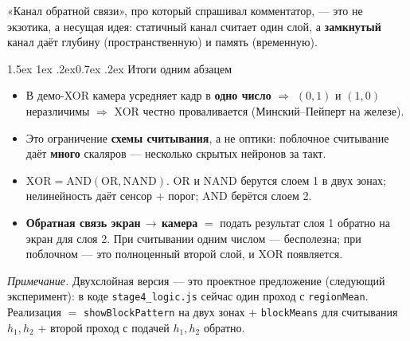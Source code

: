 \documentclass[11pt]{article}
\makeatletter
\renewcommand\section{\@startsection{section}{1}{\z@}%
  {1.5ex \@plus 1ex \@minus .2ex}{0.7ex \@plus.2ex}%
  {\sffamily\Large\bfseries\color{accent}}}
\newenvironment{keybox}
 {\begin{lrbox}{\keybuf}\begin{minipage}{\dimexpr\linewidth-2\fboxsep-2\fboxrule}}
 {\end{minipage}\end{lrbox}%
  \par\smallskip\noindent
  \setlength{\fboxsep}{9pt}\setlength{\fboxrule}{0.9pt}%
  \fcolorbox{accent}{soft}{\usebox{\keybuf}}\par\smallskip}
\makeatother
\begin{document}
\noindent «Канал обратной связи», про который спрашивал комментатор, — это не
экзотика, а несущая идея: статичный канал считает один слой, а \textbf{замкнутый}
канал даёт глубину (пространственную) и память (временную).

\section{Итоги одним абзацем}

\begin{keybox}
\begin{itemize}
\item В демо-XOR камера усредняет кадр в \textbf{одно число} $\Rightarrow$ $(0,1)$
и $(1,0)$ неразличимы $\Rightarrow$ XOR честно проваливается (Минский–Пейперт на
железе).
\item Это ограничение \textbf{схемы считывания}, а не оптики: поблочное
считывание даёт \textbf{много} скаляров — несколько скрытых нейронов за такт.
\item $\text{XOR}=\text{AND}(\text{OR},\text{NAND})$. OR и NAND берутся слоем 1 в
двух зонах; нелинейность даёт сенсор $+$ порог; AND берётся слоем 2.
\item \textbf{Обратная связь экран\,$\to$\,камера} $=$ подать результат слоя 1
обратно на экран для слоя 2. При считывании одним числом — бесполезна; при
поблочном — это полноценный второй слой, и XOR появляется.
\end{itemize}
\end{keybox}

\vspace{0.6em}
\noindent\footnotesize\textit{Примечание.} Двухслойная версия — это проектное
предложение (следующий эксперимент): в коде \texttt{stage4\_logic.js} сейчас один
проход с \texttt{regionMean}. Реализация $=$ \texttt{showBlockPattern} на двух
зонах $+$ \texttt{blockMeans} для считывания $h_1,h_2$ $+$ второй проход с подачей
$h_1,h_2$ обратно.
\end{document}
